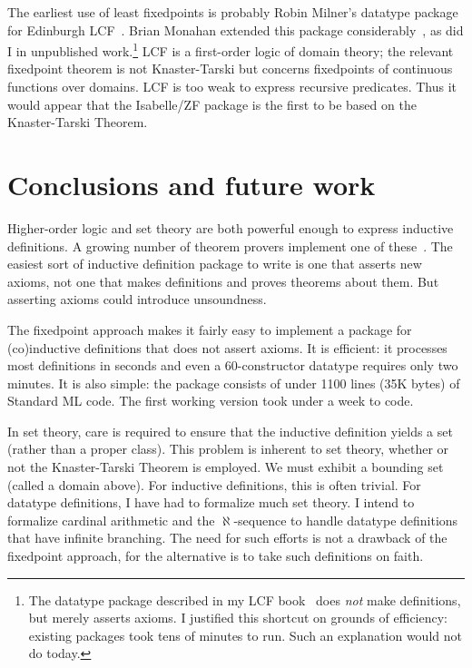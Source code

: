 The earliest use of least fixedpoints is probably Robin Milner's datatype
package for Edinburgh LCF~\cite{milner-ind}.  Brian Monahan extended this
package considerably~\cite{monahan84}, as did I in unpublished
work.\footnote{The datatype package described in my LCF
  book~\cite{paulson87} does {\it not\/} make definitions, but merely
  asserts axioms.  I justified this shortcut on grounds of efficiency:
  existing packages took tens of minutes to run.  Such an explanation would
  not do today.}
LCF is a first-order logic of domain theory; the relevant fixedpoint
theorem is not Knaster-Tarski but concerns fixedpoints of continuous
functions over domains.  LCF is too weak to express recursive predicates.
Thus it would appear that the Isabelle/ZF package is the first to be based
on the Knaster-Tarski Theorem.


\section{Conclusions and future work}
Higher-order logic and set theory are both powerful enough to express
inductive definitions.  A growing number of theorem provers implement one
of these~\cite{IMPS,saaltink-fme}.  The easiest sort of inductive
definition package to write is one that asserts new axioms, not one that
makes definitions and proves theorems about them.  But asserting axioms
could introduce unsoundness.

The fixedpoint approach makes it fairly easy to implement a package for
(co)inductive definitions that does not assert axioms.  It is efficient: it
processes most definitions in seconds and even a 60-constructor datatype
requires only two minutes.  It is also simple: the package consists of
under 1100 lines (35K bytes) of Standard ML code.  The first working
version took under a week to code.

In set theory, care is required to ensure that the inductive definition
yields a set (rather than a proper class).  This problem is inherent to set
theory, whether or not the Knaster-Tarski Theorem is employed.  We must
exhibit a bounding set (called a domain above).  For inductive definitions,
this is often trivial.  For datatype definitions, I have had to formalize
much set theory.  I intend to formalize cardinal arithmetic and the
$\aleph$-sequence to handle datatype definitions that have infinite
branching.  The need for such efforts is not a drawback of the fixedpoint
approach, for the alternative is to take such definitions on faith.

